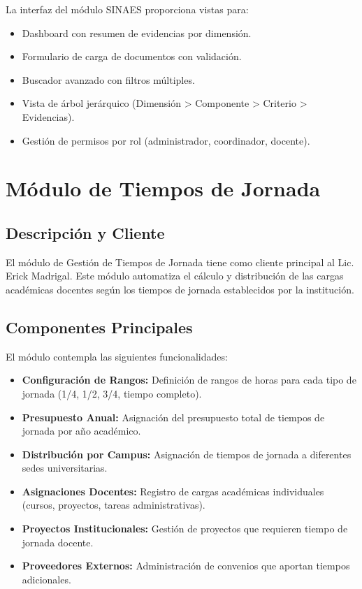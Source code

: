 La interfaz del módulo SINAES proporciona vistas para:

\begin{itemize}
    \item Dashboard con resumen de evidencias por dimensión.
    \item Formulario de carga de documentos con validación.
    \item Buscador avanzado con filtros múltiples.
    \item Vista de árbol jerárquico (Dimensión > Componente > Criterio > Evidencias).
    \item Gestión de permisos por rol (administrador, coordinador, docente).
\end{itemize}

\section{Módulo de Tiempos de Jornada}

\subsection{Descripción y Cliente}

El módulo de Gestión de Tiempos de Jornada tiene como cliente principal al Lic. Erick Madrigal. Este módulo automatiza el cálculo y distribución de las cargas académicas docentes según los tiempos de jornada establecidos por la institución.

\subsection{Componentes Principales}

El módulo contempla las siguientes funcionalidades:

\begin{itemize}
    \item \textbf{Configuración de Rangos:} Definición de rangos de horas para cada tipo de jornada (1/4, 1/2, 3/4, tiempo completo).
    \item \textbf{Presupuesto Anual:} Asignación del presupuesto total de tiempos de jornada por año académico.
    \item \textbf{Distribución por Campus:} Asignación de tiempos de jornada a diferentes sedes universitarias.
    \item \textbf{Asignaciones Docentes:} Registro de cargas académicas individuales (cursos, proyectos, tareas administrativas).
    \item \textbf{Proyectos Institucionales:} Gestión de proyectos que requieren tiempo de jornada docente.
    \item \textbf{Proveedores Externos:} Administración de convenios que aportan tiempos adicionales.
\end{itemize}

